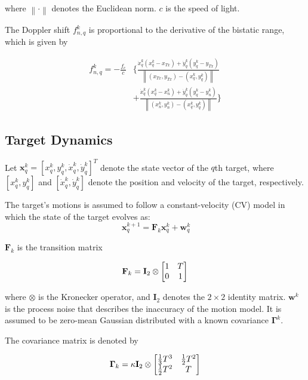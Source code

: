 \documentclass[12pt,journal,draftclsnofoot,onecolumn]{IEEEtran}
\begin{document}
where $\left \|\cdot\right\|$ denotes the Euclidean norm. $c$ is the speed of light.

The Doppler shift $f_{n,q}^k$ is proportional to the derivative of the bistatic range, which is given by

\begin{equation} 
	\begin{aligned}
	f_{n,q}^k = - \frac{f_c}{c}& \bigg\{\frac{\dot{x}_q^k\left(x_q^k - x_{Tx} \right) +\dot{y}_q^k \left(y_q^k - y_{Tx} \right)}{\left \|(x_{Tx},y_{Tx})-(x_q^k,y_q^k)\right \|}\\
	&+\frac{\dot{x}_q^k\left(x_q^k - x_n^k \right) +\dot{y}_q^k \left(y_q^k - y_n^k \right)}{\left \|(x_n^k,y_n^k)-(x_q^k,y_q^k)\right \|}\bigg\}
	\end{aligned}
	\label{doppler shift}
\end{equation}


\subsection{Target Dynamics}
Let $\mathbf{x}_q^k={[x_q^k, y_q^k, \dot{x}_q^k, \dot{y}_q^k]^T}$ denote the state vector of the $q$th target, where $\left[ x_q^k, y_q^k \right]$ and $\left[ \dot{x}_q^k, \dot{y}_q^k \right]$ denote the position and velocity of the target, respectively.

The target's motions is assumed to follow a constant-velocity (CV) model in which the state of the target evolves as:
\begin{equation}\ \mathbf{x}_q^{k+1}=\mathbf{F}_k\mathbf{x}_q^k+\mathbf{w}_q^k\end{equation}

$\mathbf{F}_k$ is the transition matrix

\begin{equation}
    {\bf F}_k={\bf I}_{2}\otimes\left[\begin{matrix}1 & T \\ 0 & 1\end{matrix}\right]
\end{equation}

where $\otimes$ is the Kronecker operator, and $\mathbf{I}_2$ denotes the $2\times 2$ identity matrix. $\mathbf{w}^k$ is the process noise that describes the inaccuracy of the motion model. It is assumed to be zero-mean Gaussian distributed with a known covariance $\mathbf{\Gamma}^k$.

The covariance matrix is denoted by

\begin{equation}
    {\bf \Gamma}_{k}=\kappa {\bf I}_{2}\otimes\left[\begin{matrix} {1\over 3}T^{3}&{1\over 2}T^{2}\\ {1\over 2}T^{2}&T\end{matrix}\right]
\end{equation}
\end{document}
